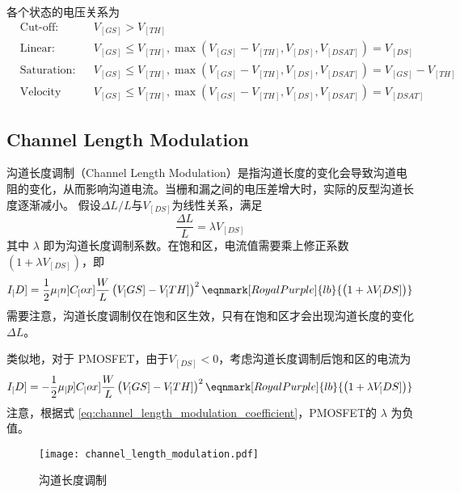 各个状态的电压关系为
\begin{equation}
    \begin{aligned}
        & \text{Cut-off:} && V_[GS] > V_[TH] \\
        & \text{Linear:} && V_[GS] \leqslant V_[TH], \max \left(V_[GS] - V_[TH], V_[DS], V_[DSAT]\right) = V_[DS] \\
        & \text{Saturation:} && V_[GS] \leqslant V_[TH], \max \left(V_[GS] - V_[TH], V_[DS], V_[DSAT]\right) = V_[GS] - V_[TH] \\
        & \text{Velocity Saturation:} && V_[GS] \leqslant V_[TH], \max \left(V_[GS] - V_[TH], V_[DS], V_[DSAT]\right) = V_[DSAT]
    \end{aligned}
\end{equation}

\subsection{Channel Length Modulation}
沟道长度调制（Channel Length Modulation）是指沟道长度的变化会导致沟道电阻的变化，从而影响沟道电流。当栅和漏之间的电压差增大时，实际的反型沟道长度逐渐减小。
假设$\Delta L / L$与$V_[DS]$为线性关系，满足
\begin{equation}
    \frac{\Delta L}{L} = \lambda V_[DS]
    \label{eq:channel_length_modulation_coefficient}
\end{equation}
其中 $\lambda$ 即为沟道长度调制系数。在饱和区，电流值需要乘上修正系数 $\left(1 + \lambda V_[DS]\right)$，即
\begin{equation}
    I_[D] = \frac{1}{2} \mu_[n] C_[ox] \frac{W}{L} \left( V_[GS] - V_[TH] \right)^2 \eqnmark[RoyalPurple]{lb}{\left( 1 + \lambda V_[DS] \right)}
\end{equation}
需要注意，沟道长度调制仅在饱和区生效，只有在饱和区才会出现沟道长度的变化$\Delta L$。

类似地，对于 PMOSFET，由于$V_[DS]<0$，考虑沟道长度调制后饱和区的电流为
\begin{equation}
    I_[D] = -\frac{1}{2} \mu_[p] C_[ox] \frac{W}{L} \left( V_[GS] - V_[TH] \right)^2 \eqnmark[RoyalPurple]{lb}{\left( 1 + \lambda V_[DS] \right)}
\end{equation}
注意，根据式 \ref{eq:channel_length_modulation_coefficient}，PMOSFET的 $\lambda$ 为负值。

\begin{figure}
    \centering
    \texttt{[image: channel\_length\_modulation.pdf]}
    \caption{沟道长度调制\cite{NeamenSemiconductor}}
    \label{fig:channel_length_modulation}
\end{figure}

